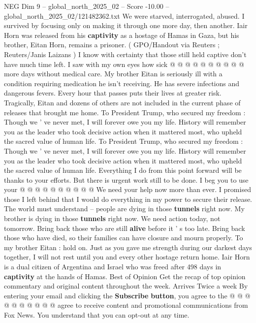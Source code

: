 \begin{textsample}{NEG Dim 9 – global\_north\_2025\_02 – Score -10.00 – global\_north\_2025\_02/121482362.txt}
We were starved, interrogated, abused.
I survived by focusing only on making it through one more day, then another.
Iair Horn was released from his \textbf{captivity} as a hostage of Hamas in Gaza, but his brother, Eitan Horn, remains a prisoner. ( GPO/Handout via Reuters ; Reuters/Janis Laizans ) I know with certainty that those still held captive don't have much time left.
I saw with my own eyes how sick @ @ @ @ @ @ @ @ @ @ more days without medical care.
My brother Eitan is seriously ill with a condition requiring medication he isn't receiving.
He has severe infections and dangerous fevers.
Every hour that passes puts their lives at greater risk.
Tragically, Eitan and dozens of others are not included in the current phase of releases that brought me home.
To President Trump, who secured my freedom : Though we ' ve never met, I will forever owe you my life.
History will remember you as the leader who took decisive action when it mattered most, who upheld the sacred value of human life.
To President Trump, who secured my freedom : Though we ' ve never met, I will forever owe you my life.
History will remember you as the leader who took decisive action when it mattered most, who upheld the sacred value of human life.
Everything I do from this point forward will be thanks to your efforts.
But there is urgent work still to be done.
I beg you to use your @ @ @ @ @ @ @ @ @ @ We need your help now more than ever.
I promised those I left behind that I would do everything in my power to secure their release.
The world must understand -- people are dying in those \textbf{tunnels} right now.
My brother is dying in those \textbf{tunnels} right now.
We need action today, not tomorrow.
Bring back those who are still \textbf{alive} before it ' s too late.
Bring back those who have died, so their families can have closure and mourn properly.
To my brother Eitan : hold on.
Just as you gave me strength during our darkest days together, I will not rest until you and every other hostage return home.
Iair Horn is a dual citizen of Argentina and Israel who was freed after 498 days in \textbf{captivity} at the hands of Hamas.
Best of Opinion Get the recap of top opinion commentary and original content throughout the week.
Arrives Twice a week By entering your email and clicking the \textbf{Subscribe} \textbf{button}, you agree to the @ @ @ @ @ @ @ @ @ @ agree to receive content and promotional communications from Fox News.
You understand that you can opt-out at any time.

\end{textsample}
